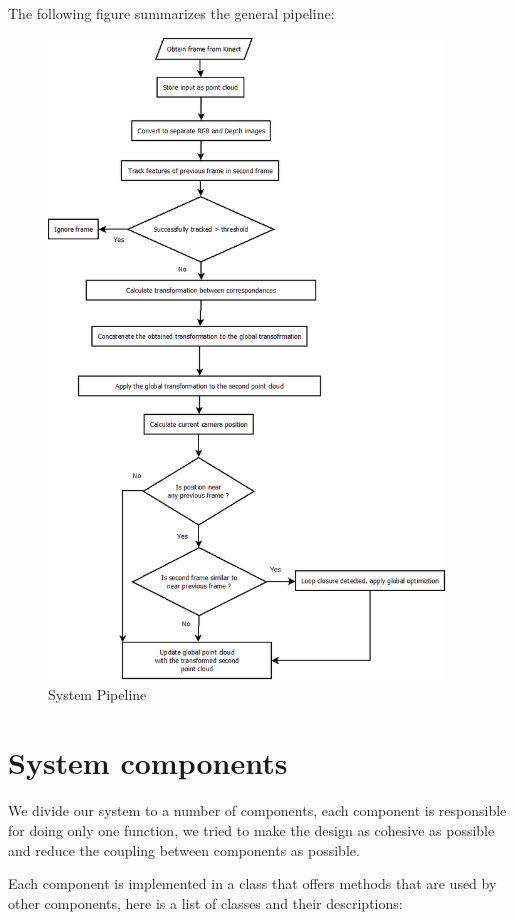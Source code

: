 The following figure summarizes the general pipeline:
\begin{figure}[H]
\centering
\includegraphics[height=170mm]{System_Analysis_and_Design/pipeline.png}
\caption{System Pipeline}
\label{fig:system_pipeline}
\end{figure}

\section{System components}

We divide our system to a number of components, each component is responsible for doing only one function, we tried to make the design as cohesive as possible and reduce the coupling between components as possible.

Each component is implemented in a class that offers methods that are used by other components, here is a list of classes and their descriptions:

